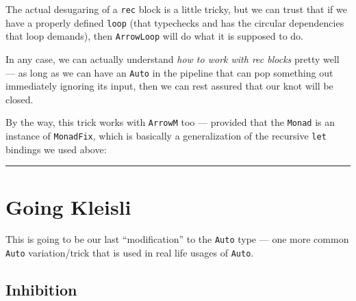 \documentclass[]{article}
\newenvironment{Shaded}{}{}
\newcommand{\CommentTok}[1]{\textcolor[rgb]{0.38,0.63,0.69}{\textit{#1}}}
\newcommand{\DataTypeTok}[1]{\textcolor[rgb]{0.56,0.13,0.00}{#1}}
\newcommand{\FunctionTok}[1]{\textcolor[rgb]{0.02,0.16,0.49}{#1}}
\newcommand{\KeywordTok}[1]{\textcolor[rgb]{0.00,0.44,0.13}{\textbf{#1}}}
\newcommand{\NormalTok}[1]{#1}
\newcommand{\OperatorTok}[1]{\textcolor[rgb]{0.40,0.40,0.40}{#1}}
\newcommand{\OtherTok}[1]{\textcolor[rgb]{0.00,0.44,0.13}{#1}}
\begin{document}
The actual desugaring of a \texttt{rec} block is a little tricky, but we can
trust that if we have a properly defined \texttt{loop} (that typechecks and has
the circular dependencies that loop demands), then \texttt{ArrowLoop} will do
what it is supposed to do.

In any case, we can actually understand \emph{how to work with rec blocks}
pretty well --- as long as we can have an \texttt{Auto} in the pipeline that can
pop something out immediately ignoring its input, then we can rest assured that
our knot will be closed.

By the way, this trick works with \texttt{ArrowM} too --- provided that the
\texttt{Monad} is an instance of \texttt{MonadFix}, which is basically a
generalization of the recursive \texttt{let} bindings we used above:

\begin{Shaded}
\end{Shaded}

\begin{center}\rule{0.5\linewidth}{\linethickness}\end{center}

\hypertarget{going-kleisli}{%
\section{Going Kleisli}\label{going-kleisli}}

This is going to be our last ``modification'' to the \texttt{Auto} type --- one
more common \texttt{Auto} variation/trick that is used in real life usages of
\texttt{Auto}.

\hypertarget{inhibition}{%
\subsection{Inhibition}\label{inhibition}}
\end{document}
